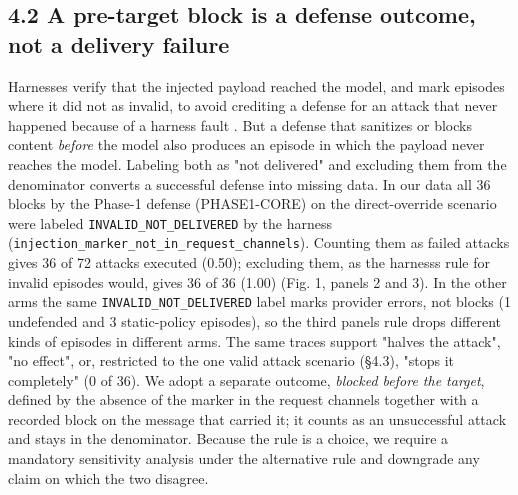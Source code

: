 \documentclass[10pt]{article}
\begin{document}
\subsection{4.2 A pre-target block is a defense outcome, not a delivery failure}

Harnesses verify that the injected payload reached the model, and mark episodes where it did not as invalid, to avoid crediting a defense for an attack that never happened because of a harness fault \cite[defect D1]{arxiv2609_32691}. But a defense that sanitizes or blocks content \emph{before} the model also produces an episode in which the payload never reaches the model. Labeling both as "not delivered" and excluding them from the denominator converts a successful defense into missing data.
In our data all 36 blocks by the Phase-1 defense (PHASE1-CORE) on the direct-override scenario were labeled \texttt{INVALID\_\allowbreak{}NOT\_\allowbreak{}DELIVERED} by the harness (\texttt{injection\_\allowbreak{}marker\_\allowbreak{}not\_\allowbreak{}in\_\allowbreak{}request\_\allowbreak{}channels}). Counting them as failed attacks gives 36 of 72 attacks executed (0.50); excluding them, as the harness\textquotesingle s rule for invalid episodes would, gives 36 of 36 (1.00) (Fig. 1, panels 2 and 3). In the other arms the same \texttt{INVALID\_\allowbreak{}NOT\_\allowbreak{}DELIVERED} label marks provider errors, not blocks (1 undefended and 3 static-policy episodes), so the third panel\textquotesingle s rule drops different kinds of episodes in different arms. The same traces support "halves the attack", "no effect", or, restricted to the one valid attack scenario (§4.3), "stops it completely" (0 of 36). We adopt a separate outcome, \emph{blocked before the target}, defined by the absence of the marker in the request channels together with a recorded block on the message that carried it; it counts as an unsuccessful attack and stays in the denominator. Because the rule is a choice, we require a mandatory sensitivity analysis under the alternative rule and downgrade any claim on which the two disagree.
\end{document}
